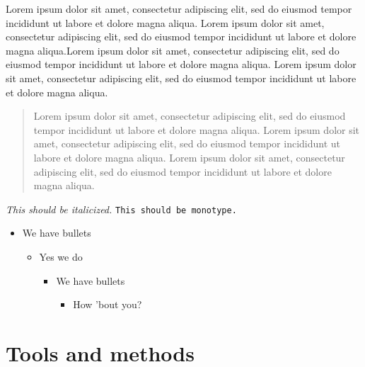 \documentclass[
  11pt,
  american,
  letterpaper,
  ]{article}
\providecommand{\tightlist}{%
\setlength{\itemsep}{0pt}\setlength{\parskip}{0pt}}
\begin{document}
Lorem ipsum dolor sit amet, consectetur adipiscing elit, sed do eiusmod
tempor incididunt ut labore et dolore magna aliqua. Lorem ipsum dolor
sit amet, consectetur adipiscing elit, sed do eiusmod tempor incididunt
ut labore et dolore magna aliqua.Lorem ipsum dolor sit amet, consectetur
adipiscing elit, sed do eiusmod tempor incididunt ut labore et dolore
magna
aliqua.\autocite{nyserdaNewYorkState2019}\autocite{epaInventoryGreenhouseGas2017}
Lorem ipsum dolor sit amet, consectetur adipiscing elit, sed do eiusmod
tempor incididunt ut labore et dolore magna aliqua.

\begin{quote}
Lorem ipsum dolor sit amet, consectetur adipiscing elit, sed do eiusmod
tempor incididunt ut labore et dolore magna aliqua. Lorem ipsum dolor
sit amet, consectetur adipiscing elit, sed do eiusmod tempor incididunt
ut labore et dolore magna aliqua. Lorem ipsum dolor sit amet,
consectetur adipiscing elit, sed do eiusmod tempor incididunt ut labore
et dolore magna aliqua.
\end{quote}

\textit{This should be italicized.} \texttt{This should be monotype.}

\begin{itemize}
\tightlist
\item
  We have bullets

  \begin{itemize}
  \tightlist
  \item
    Yes we do

    \begin{itemize}
    \tightlist
    \item
      We have bullets

      \begin{itemize}
      \tightlist
      \item
        How 'bout you?
      \end{itemize}
    \end{itemize}
  \end{itemize}
\end{itemize}

\clearpage

\hypertarget{tools-and-methods}{%
\section{Tools and methods}\label{tools-and-methods}}
\end{document}
